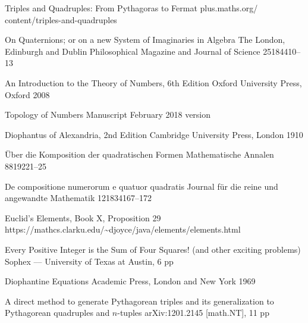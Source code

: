 \documentclass[12pt,table]{article}
\theoremstyle{definition}
\theoremstyle{remark}
\numberwithin{equation}{section}
\begin{document}
\begin{thebibliography}{1}
      {Triples and Quadruples: From Pythagoras to Fermat}
      {plus.maths.org/ content/triples-and-quadruples}{}

        {On Quaternions; or on a new System of Imaginaries in Algebra}
        {The London, Edinburgh and Dublin Philosophical Magazine
         and Journal of Science}
        {25}{1844}{10--13}


         {An Introduction to the Theory of Numbers, 6th Edition}
         {Oxford University Press, Oxford} 
         {2008}




         {Topology of Numbers}
         {Manuscript}
         {February 2018 version}



     {Diophantus of Alexandria, 2nd Edition}
     {Cambridge University Press, London}
     {1910}


        {\"Uber die Komposition der quadratischen Formen}
        {Mathematische Annalen}
        {88}{1922}{1--25}

        {De compositione numerorum e quatuor quadratis}
        {Journal f\"ur die reine und angewandte Mathematik}
        {12}{1834}{167--172}

        {Euclid's Elements, Book X, Proposition 29}
        {\\https://mathcs.clarku.edu/\~{}djoyce/java/elements/elements.html}



      {Every Positive Integer is the Sum of Four Squares! (and other
      exciting problems)} 
      {Sophex –-- University of Texas at Austin, 6
      pp}{}

         {Diophantine Equations}
         {Academic Press, London and New York} 
         {1969}




      {A direct method to generate Pythagorean triples and its
       generalization to Pythagorean quadruples and $n$-tuples}
      {arXiv:1201.2145 [math.NT], 11 pp}



\end{thebibliography}
\end{document}
